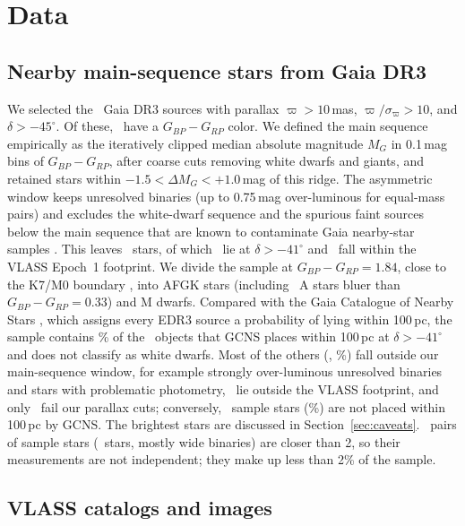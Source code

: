 \documentclass[linenumbers]{aastex702}
\begin{document}
\section{Data} \label{sec:data}

\subsection{Nearby main-sequence stars from Gaia DR3} \label{sec:gaia}

We selected the \NGaia\ Gaia DR3 sources with parallax $\varpi>10$\,mas, $\varpi/\sigma_\varpi>10$, and $\delta>-45^\circ$. Of these, \NFinite\ have a $G_{BP}-G_{RP}$ color. We defined the main sequence empirically as the iteratively clipped median absolute magnitude $M_G$ in 0.1\,mag bins of $G_{BP}-G_{RP}$, after coarse cuts removing white dwarfs and giants, and retained stars within $-1.5<\Delta M_G<+1.0$\,mag of this ridge. The asymmetric window keeps unresolved binaries (up to 0.75\,mag over-luminous for equal-mass pairs) and excludes the white-dwarf sequence and the spurious faint sources below the main sequence that are known to contaminate Gaia nearby-star samples \citep{Smart2021}. This leaves \NMS\ stars, of which \NMSdec\ lie at $\delta>-41^\circ$ and \NSample\ fall within the VLASS Epoch~1 footprint. We divide the sample at $G_{BP}-G_{RP}=1.84$, close to the K7/M0 boundary \citep{Pecaut2013}, into AFGK stars (including \NAstars\ A stars bluer than $G_{BP}-G_{RP}=0.33$) and M dwarfs. Compared with the Gaia Catalogue of Nearby Stars \citep[GCNS;][]{Smart2021}, which assigns every EDR3 source a probability of lying within 100\,pc, the sample contains \PctGCNS\% of the \NGCNS\ objects that GCNS places within 100\,pc at $\delta>-41^\circ$ and does not classify as white dwarfs. Most of the others (\NGCNSmsw, \PctGCNSmsw\%) fall outside our main-sequence window, for example strongly over-luminous unresolved binaries and stars with problematic photometry, \NGCNSfoot\ lie outside the VLASS footprint, and only \NGCNSplx\ fail our parallax cuts; conversely, \NContam\ sample stars (\PctContam\%) are not placed within 100\,pc by GCNS. The brightest stars are discussed in Section~\ref{sec:caveats}. \NPairsBeam\ pairs of sample stars (\NStarsPairs\ stars, mostly wide binaries) are closer than 2, so their measurements are not independent; they make up less than 2\% of the sample.

\subsection{VLASS catalogs and images} \label{sec:vlass}
\end{document}
